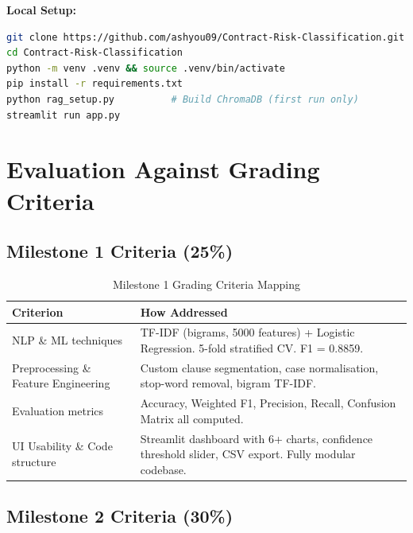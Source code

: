\documentclass[12pt,a4paper]{article}
\begin{document}
\textbf{Local Setup:}

\begin{lstlisting}[language=bash]
git clone https://github.com/ashyou09/Contract-Risk-Classification.git
cd Contract-Risk-Classification
python -m venv .venv && source .venv/bin/activate
pip install -r requirements.txt
python rag_setup.py          # Build ChromaDB (first run only)
streamlit run app.py
\end{lstlisting}

\section{Evaluation Against Grading Criteria}
\label{sec:grading}

\subsection*{Milestone 1 Criteria (25\%)}

\begin{table}[h]
\centering
\begin{tabularx}{\textwidth}{lX}
\toprule
\textbf{Criterion} & \textbf{How Addressed} \\
\midrule
NLP \& ML techniques & TF-IDF (bigrams, 5000 features) + Logistic Regression. 5-fold stratified CV. F1 = 0.8859. \\
Preprocessing \& Feature Engineering & Custom clause segmentation, case normalisation, stop-word removal, bigram TF-IDF. \\
Evaluation metrics & Accuracy, Weighted F1, Precision, Recall, Confusion Matrix all computed. \\
UI Usability \& Code structure & Streamlit dashboard with 6+ charts, confidence threshold slider, CSV export. Fully modular codebase. \\
\bottomrule
\end{tabularx}
\caption{Milestone 1 Grading Criteria Mapping}
\end{table}

\subsection*{Milestone 2 Criteria (30\%)}
\end{document}
